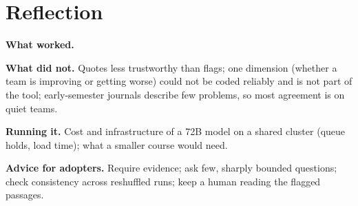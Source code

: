 \section{Reflection}
\label{sec:reflection}

\begin{outline}
  \item \textbf{What worked.} 
  \item \textbf{What did not.} Quotes less trustworthy than flags; one dimension
    (whether a team is improving or getting worse) could not be coded reliably and is not
    part of the tool;
    early-semester journals describe few problems, so most agreement is on quiet teams.
  \item \textbf{Running it.} Cost and infrastructure of a 72B model on a shared cluster
    (queue holds, load time); what a smaller course would need.
  \item \textbf{Advice for adopters.} Require evidence; ask few, sharply bounded questions;
    check consistency across reshuffled runs; keep a human reading the flagged passages.
\end{outline}

